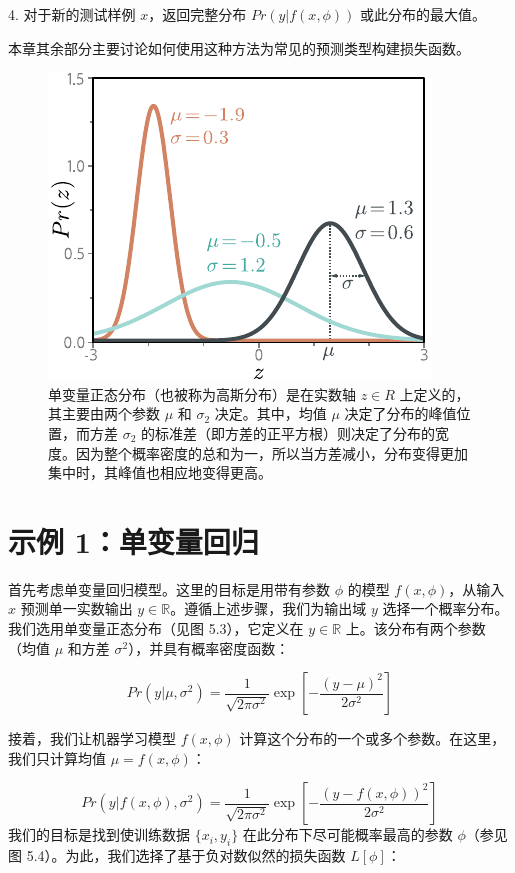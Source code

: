 \documentclass[lang=cn,newtx,10pt,scheme=chinese]{elegantbook}
\begin{document}
4. 对于新的测试样例 \(x\)，返回完整分布 \(Pr(y|f(x, \phi))\) 或此分布的最大值。

本章其余部分主要讨论如何使用这种方法为常见的预测类型构建损失函数。

\begin{figure}[ht!]
	\centering
	\includegraphics[width=0.7\linewidth]{PDFFigures/UDLChap5PDF/LossNorm.pdf}
	\caption{单变量正态分布（也被称为高斯分布）是在实数轴 \(z \in R\) 上定义的，其主要由两个参数 \(\mu\) 和 \(\sigma_2\) 决定。其中，均值 \(\mu\) 决定了分布的峰值位置，而方差 \(\sigma_2\) 的标准差（即方差的正平方根）则决定了分布的宽度。因为整个概率密度的总和为一，所以当方差减小，分布变得更加集中时，其峰值也相应地变得更高。}
\end{figure}

\section{示例 1：单变量回归}

首先考虑单变量回归模型。这里的目标是用带有参数 \(\phi\) 的模型 \(f(x, \phi)\)，从输入 \(x\) 预测单一实数输出 \(y \in \mathbb{R}\)。遵循上述步骤，我们为输出域 \(y\) 选择一个概率分布。我们选用单变量正态分布（见图 5.3），它定义在 \(y \in \mathbb{R}\) 上。该分布有两个参数（均值 \(\mu\) 和方差 \(\sigma^2\)），并具有概率密度函数：

\begin{equation}
	Pr(y|\mu, \sigma^2) = \frac{1}{\sqrt{2\pi\sigma^2}} \exp \left[ -\frac{(y - \mu)^2}{2\sigma^2} \right] 
\end{equation}

接着，我们让机器学习模型 \(f(x, \phi)\) 计算这个分布的一个或多个参数。在这里，我们只计算均值 \(\mu = f(x, \phi)\)：

\begin{equation}
Pr(y|f(x, \phi), \sigma^2) = \frac{1}{\sqrt{2\pi\sigma^2}} \exp \left[ -\frac{(y - f(x, \phi))^2}{2\sigma^2} \right] 
\end{equation}
我们的目标是找到使训练数据 \(\{x_i, y_i\}\) 在此分布下尽可能概率最高的参数 \(\phi\)（参见图 5.4）。为此，我们选择了基于负对数似然的损失函数 \(L[\phi]\)：
\end{document}

